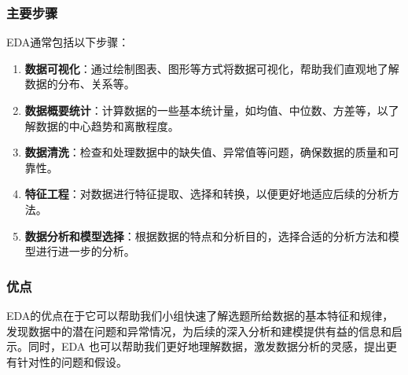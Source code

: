 \documentclass[UTF8]{ctexart}
\begin{document}
\subsubsection{主要步骤}
EDA通常包括以下步骤：
\begin{enumerate}
  \item \textbf{数据可视化}：通过绘制图表、图形等方式将数据可视化，帮助我们直观地了解数据的分布、关系等。
  \item \textbf{数据概要统计}：计算数据的一些基本统计量，如均值、中位数、方差等，以了解数据的中心趋势和离散程度。
  \item \textbf{数据清洗}：检查和处理数据中的缺失值、异常值等问题，确保数据的质量和可靠性。
  \item \textbf{特征工程}：对数据进行特征提取、选择和转换，以便更好地适应后续的分析方法。
  \item \textbf{数据分析和模型选择}：根据数据的特点和分析目的，选择合适的分析方法和模型进行进一步的分析。
\end{enumerate}
\subsubsection{优点}
EDA的优点在于它可以帮助我们小组快速了解选题所给数据的基本特征和规律，发现数据中的潜在问题和异常情况，为后续的深入分析和建模提供有益的信息和启示。同时，EDA 也可以帮助我们更好地理解数据，激发数据分析的灵感，提出更有针对性的问题和假设。
\end{document}
